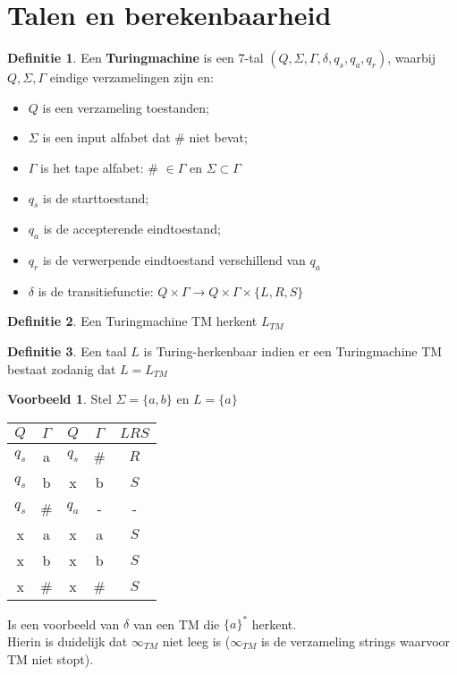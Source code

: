 \documentclass[12pt,a4paper]{article}
\theoremstyle{definition}
\newtheorem{defi}{Definitie}[section]
\newtheorem{vb}{Voorbeeld}[section]
\newcommand{\ra}{\ensuremath{\rightarrow}}
\begin{document}
	\section{Talen en berekenbaarheid}
	\begin{defi}
		Een \textbf{Turingmachine} is een 7-tal $(Q,\Sigma,\Gamma,\delta,q_s,q_a,q_r)$, waarbij $Q,\Sigma,\Gamma$ eindige verzamelingen zijn en:
		\begin{itemize}
			\item $Q$ is een verzameling toestanden;
			\item $\Sigma$ is een input alfabet dat \# niet bevat;
			\item $\Gamma$ is het tape alfabet: \# $\in \Gamma$ en $\Sigma \subset \Gamma$
			\item $q_s$ is de starttoestand;
			\item $q_a$ is de accepterende eindtoestand;
			\item $q_r$ is de verwerpende eindtoestand verschillend van $q_a$
			\item $\delta$ is de transitiefunctie: $Q\times\Gamma \ra Q \times \Gamma \times \{L,R,S\}$
		\end{itemize}
	\end{defi}
	\begin{defi}
		Een Turingmachine TM herkent $L_{TM}$
	\end{defi}
	\begin{defi}
		Een taal $L$ is Turing-herkenbaar indien er een Turingmachine TM bestaat zodanig dat $L = L_{TM}$
	\end{defi}
	\begin{vb}
		Stel $\Sigma = \{a,b\}$ en $L=\{a\}$
		\begin{table}[H]
			\centering
			\begin{tabular}{|c|c||c|c|c|}
				\hline $Q$ & $\Gamma$ & $Q$ & $\Gamma$ & $LRS$ \\ 
				\hline $q_s$ & a & $q_s$ & \# & $R$ \\ 
				$q_s$ & b & x & b & $S$ \\ 
				$q_s$ & \# & $q_a$ & - & - \\ 
				x & a & x & a & $S$ \\ 
				x & b & x & b & $S$ \\ 
				x & \# & x & \# & $S$ \\ 
				\hline 
			\end{tabular}
		\end{table}
		Is een voorbeeld van $\delta$ van een TM die $\{a\}^*$ herkent.\\
		Hierin is duidelijk dat $\infty_{TM}$ niet leeg is ($\infty_{TM}$ is de verzameling strings waarvoor TM niet stopt).\\	
	\end{vb}
\end{document}
